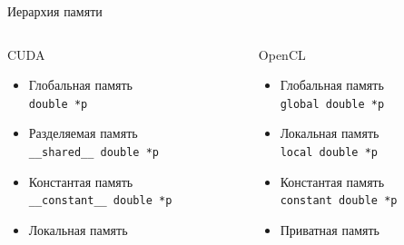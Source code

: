 \documentclass[@BEAMER_OPTIONS@]{beamer}
\newcommand{\code}[1]{\lstinline|#1|}
\begin{document}
\begin{frame}
    \sectionpage
\end{frame}

\begin{frame}[fragile]{Иерархия памяти}
    \begin{columns}
        \begin{column}{0.48\textwidth}
            \begin{block}{CUDA}
                \begin{itemize}
                    \item<1-> Глобальная память\\
                        \code{double *p}
                    \item<2-> Разделяемая память\\
                        \code{__shared__ double *p}
                    \item<3-> Константая память\\
                        \code{__constant__ double *p}
                    \item<4-> Локальная память
                \end{itemize}
            \end{block}
        \end{column}
        \begin{column}{0.48\textwidth}
            \begin{block}{OpenCL}
                \begin{itemize}
                    \item<1-> Глобальная память\\
                        \code{global double *p}
                    \item<2-> Локальная память\\
                        \code{local double *p}
                    \item<3-> Константая память\\
                        \code{constant double *p}
                    \item<4-> Приватная память
                \end{itemize}
            \end{block}
        \end{column}
    \end{columns}
\end{frame}
\end{document}
